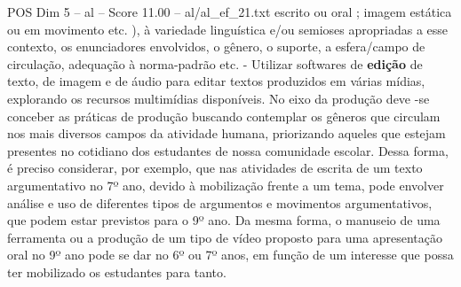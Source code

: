 \begin{textsample}{POS Dim 5 – al – Score 11.00 – al/al\_ef\_21.txt}
escrito ou oral ; imagem estática ou em movimento etc. ), à variedade linguística e/ou semioses apropriadas a esse contexto, os enunciadores envolvidos, o gênero, o suporte, a esfera/campo de circulação, adequação à norma-padrão etc. - Utilizar softwares de \textbf{edição} de texto, de imagem e de áudio para editar textos produzidos em várias mídias, explorando os recursos multimídias disponíveis.
No eixo da produção deve -se conceber as práticas de produção buscando contemplar os gêneros que circulam nos mais diversos campos da atividade humana, priorizando aqueles que estejam presentes no cotidiano dos estudantes de nossa comunidade escolar.
Dessa forma, é preciso considerar, por exemplo, que nas atividades de escrita de um texto argumentativo no 7º ano, devido à mobilização frente a um tema, pode envolver análise e uso de diferentes tipos de argumentos e movimentos argumentativos, que podem estar previstos para o 9º ano.
Da mesma forma, o manuseio de uma ferramenta ou a produção de um tipo de vídeo proposto para uma apresentação oral no 9º ano pode se dar no 6º ou 7º anos, em função de um interesse que possa ter mobilizado os estudantes para tanto.

\end{textsample}
